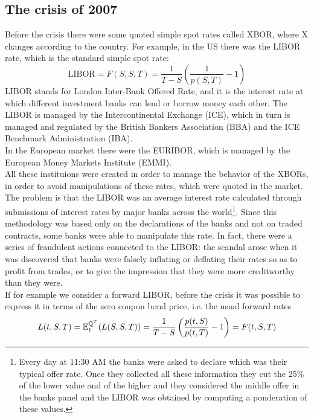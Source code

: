 \subsection{The crisis of 2007} %
Before the crisis there were some quoted simple spot rates called XBOR, where X changes according to the country. For example, in the US there was the LIBOR rate, which is the standard simple spot rate:
\begin{equation}
    \text{LIBOR} = F(S,S,T) = \frac{1}{T-S}\left(\frac{1}{p(S,T)}-1\right)
\end{equation}
LIBOR stands for London Inter-Bank Offered Rate, and it is the interest rate at which different investment banks can lend or borrow money each other. The LIBOR is managed by the Intercontinental Exchange (ICE), which in turn is managed and regulated by the British Bankers Association (BBA) and the ICE Benchmark Administration (IBA).\\
In the European market there were the EURIBOR, which is managed by the European Money Markets Institute (EMMI).\\
All these instituions were created in order to manage the behavior of the XBORs, in order to avoid manipulations of these rates, which were quoted in the market. The problem is that the LIBOR was an average interest rate calculated through submissions of interest rates by major banks across the world\footnote{Every day at 11:30 AM the banks were asked to declare which was their typical offer rate. Once they collected all these information they cut the 25\% of the lower value and of the higher and they considered the middle offer in the banks panel and the LIBOR was obtained by computing a ponderation of these values.}. Since this methodology was based only on the declarations of the banks and not on traded contracts, some banks were able to manipulate this rate. In fact, there were a series of fraudulent actions connected to the LIBOR: the scandal arose when it was discovered that banks were falsely inflating or deflating their rates so as to profit from trades, or to give the impression that they were more creditworthy than they were. \\
If for example we consider a forward LIBOR, before the crisis it was possible to express it in terms of the zero coupon bond price, i.e. the usual forward rates
\begin{equation*}
    L(t,S,T) = \mathbb{E}^{\mathbb{Q}^T}_t(L(S,S,T)) = \frac{1}{T-S}\left(\frac{p(t,S)}{p(t,T)}-1\right) = F(t,S,T)
\end{equation*}

